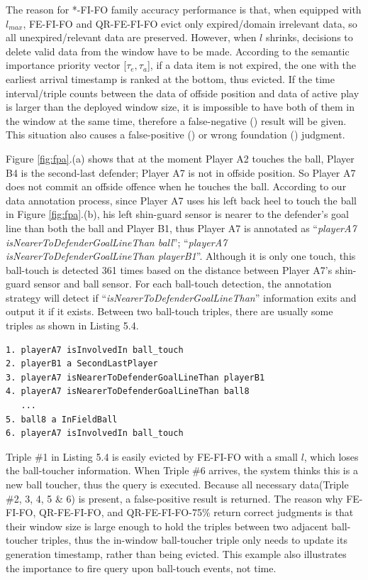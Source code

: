 The reason for *-FI-FO family accuracy performance is that, when equipped with $l_{max}$, FE-FI-FO and QR-FE-FI-FO evict only expired\slash domain irrelevant data, so all unexpired\slash relevant data are preserved.
However, when $l$ shrinks, decisions to delete valid data from the window have to be made. 
According to the semantic importance priority vector [$\tau_{e}, \tau_{a}$], if a data item is not expired, the one with the earliest arrival timestamp is ranked at the bottom, thus evicted. 
If the time interval/triple counts between the data of offside position and data of active play is larger than the deployed window size, it is impossible to have both of them in the window at the same time, therefore a false-negative (\textcolor{red}{\texttimes}) result will be given.
This situation also causes a false-positive (\textcolor{red}{\newmoon}) or wrong foundation (\textcolor{red}{\fullmoon}) judgment. 

Figure \ref{fig:fpa}.(a) shows that at the moment Player A2 touches the ball, Player B4 is the second-last defender; Player A7 is not in offside position.
So Player A7 does not commit an offside offence when he touches the ball.
According to our data annotation process, since Player A7 uses his left back heel to touch the ball in Figure \ref{fig:fpa}.(b), his left shin-guard sensor is nearer to the defender's goal line than both the ball and Player B1, thus Player A7 is annotated as ``\textit{playerA7 isNearerToDefenderGoalLineThan ball}''; ``\textit{playerA7 isNearerToDefenderGoalLineThan playerB1}''.
Although it is only one touch, this ball-touch is detected 361 times based on the distance between Player A7's shin-guard sensor and ball sensor.
For each ball-touch detection, the annotation strategy will detect if ``\textit{isNearerToDefenderGoalLineThan}'' information exits and output it if it exists.
Between two ball-touch triples, there are usually some triples as shown in Listing 5.4. 

\begin{lstlisting}[caption={Ball Touch Annotation},basicstyle=\small, frame=single]
1. playerA7 isInvolvedIn ball_touch
2. playerB1 a SecondLastPlayer
3. playerA7 isNearerToDefenderGoalLineThan playerB1
4. playerA7 isNearerToDefenderGoalLineThan ball8
   ...
5. ball8 a InFieldBall
6. playerA7 isInvolvedIn ball_touch
\end{lstlisting}

Triple \#1 in Listing 5.4 is easily evicted by FE-FI-FO with a small $l$, which loses the ball-toucher information.
When Triple \#6 arrives, the system thinks this is a new ball toucher, thus the query is executed.
Because all necessary data(Triple \#2, 3, 4, 5 \& 6) is present, a false-positive result is returned.
The reason why FE-FI-FO, QR-FE-FI-FO, and QR-FE-FI-FO-75\% return correct judgments is that their window size is large enough to hold the triples between two adjacent ball-toucher triples, thus the in-window ball-toucher triple only needs to update its generation timestamp, rather than being evicted.
This example also illustrates the importance to fire query upon ball-touch events, not time. 

